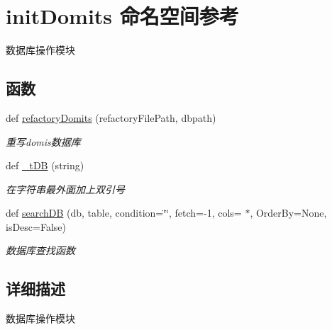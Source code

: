 \hypertarget{namespaceinit_domits}{}\section{init\+Domits 命名空间参考}
\label{namespaceinit_domits}


数据库操作模块  


\subsection*{函数}
\begin{DoxyCompactItemize}
\item 
def \mbox{\hyperlink{group___xE6_x95_xB0_xE6_x8D_xAE_xE5_xBA_x93_xE6_x93_x8D_xE4_xBD_x9C_ga7cf18932eaa3e3b83f60132e1de06e82}{refactory\+Domits}} (refactory\+File\+Path, dbpath)
\begin{DoxyCompactList}\small\item\em 重写domis数据库 \end{DoxyCompactList}\item 
def \mbox{\hyperlink{group___xE6_x95_xB0_xE6_x8D_xAE_xE5_xBA_x93_xE6_x93_x8D_xE4_xBD_x9C_gab6a167211fea45f940088aa25e470456}{\+\_\+t\+DB}} (string)
\begin{DoxyCompactList}\small\item\em 在字符串最外面加上双引号 \end{DoxyCompactList}\item 
def \mbox{\hyperlink{group___xE6_x95_xB0_xE6_x8D_xAE_xE5_xBA_x93_xE6_x93_x8D_xE4_xBD_x9C_gab0b2210b38aa2decfc4f09e122f949bf}{search\+DB}} (db, table, condition=\char`\"{}\char`\"{}, fetch=-\/1, cols=\textquotesingle{} $\ast$\textquotesingle{}, Order\+By=None, is\+Desc=False)
\begin{DoxyCompactList}\small\item\em 数据库查找函数 \end{DoxyCompactList}\end{DoxyCompactItemize}


\subsection{详细描述}
数据库操作模块 